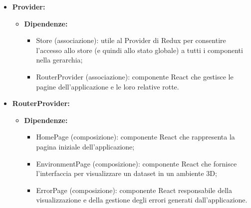 \begin{itemize}
      \item \textbf{Provider:}
            \begin{itemize}
                  \item \textbf{Dipendenze:}
                        \begin{itemize}
                              \item Store (associazione): utile al Provider di Redux per consentire l'accesso allo
                                    store (e quindi allo stato globale) a tutti i componenti nella gerarchia;
                              \item RouterProvider (associazione): componente React che gestisce le pagine
                                    dell'applicazione e le loro relative rotte.
                        \end{itemize}
            \end{itemize}

      \item \textbf{RouterProvider:}
            \begin{itemize}
                  \item \textbf{Dipendenze:}
                        \begin{itemize}
                              \item HomePage (composizione): componente React che rappresenta la pagina iniziale
                                    dell'applicazione;
                              \item EnvironmentPage (composizione): componente React che fornisce l'interfaccia per
                                    visualizzare un dataset in un ambiente 3D;
                              \item ErrorPage (composizione): componente React responsabile della visualizzazione e
                                    della gestione degli errori generati dall'applicazione.
                        \end{itemize}
            \end{itemize}
\end{itemize}

\pagebreak

